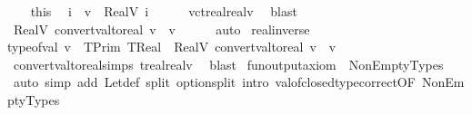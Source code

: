 \begin{isabellebody}
\ \ \isamarkupfalse%
\ this\ \isamarkupfalse%
\ i\ \ {\isachardoublequoteopen}v\ {\isacharequal}{\kern0pt}\ RealV\ i{\isachardoublequoteclose}\isanewline
\ \ \ \ \isamarkupfalse%
\ vc{\isacharunderscore}{\kern0pt}treal{\isacharunderscore}{\kern0pt}realv\ \isamarkupfalse%
\ blast\isanewline
\ \ \isamarkupfalse%
\ {\isachardoublequoteopen}RealV\ {\isacharparenleft}{\kern0pt}convert{\isacharunderscore}{\kern0pt}val{\isacharunderscore}{\kern0pt}to{\isacharunderscore}{\kern0pt}real\ v{\isacharparenright}{\kern0pt}\ {\isacharequal}{\kern0pt}\ v{\isachardoublequoteclose}\isanewline
\ \ \ \ \isamarkupfalse%
\ auto\isanewline
{}\isamarkupfalse%
%
\endisatagproof
{\isafoldproof}%
%
\isadelimproof
\isanewline
%
\endisadelimproof
\isanewline
{}\isamarkupfalse%
\ real{\isacharunderscore}{\kern0pt}inverse{\isacharunderscore}{\kern0pt}{}{\isacharcolon}{\kern0pt}\isanewline
{\isachardoublequoteopen}type{\isacharunderscore}{\kern0pt}of{\isacharunderscore}{\kern0pt}val\ v\ {\isacharequal}{\kern0pt}\ TPrim\ TReal\ {\isasymLongrightarrow}\ RealV\ {\isacharparenleft}{\kern0pt}convert{\isacharunderscore}{\kern0pt}val{\isacharunderscore}{\kern0pt}to{\isacharunderscore}{\kern0pt}real\ v{\isacharparenright}{\kern0pt}\ {\isacharequal}{\kern0pt}\ v{\isachardoublequoteclose}\isanewline
%
\isadelimproof
\ \ %
\endisadelimproof
%
\isatagproof
{}\isamarkupfalse%
\ convert{\isacharunderscore}{\kern0pt}val{\isacharunderscore}{\kern0pt}to{\isacharunderscore}{\kern0pt}real{\isachardot}{\kern0pt}simps{\isacharparenleft}{\kern0pt}{}{\isacharparenright}{\kern0pt}\ treal{\isacharunderscore}{\kern0pt}realv\ \isamarkupfalse%
\ blast%
\endisatagproof
{\isafoldproof}%
%
\isadelimproof
%
\endisadelimproof
%
\isadelimdocument
%
\endisadelimdocument
%
\isatagdocument
%
\isamarkuptrue%
%
\endisatagdocument
{\isafolddocument}%
%
\isadelimdocument
%
\endisadelimdocument
{}\isamarkupfalse%
\ fun{\isacharunderscore}{\kern0pt}output{\isacharunderscore}{\kern0pt}axiom\ \ NonEmptyTypes\ {\isacharequal}{\kern0pt}\isanewline
{\isacharparenleft}{\kern0pt}\ {\isacharparenleft}{\kern0pt}auto\ simp\ add{\isacharcolon}{\kern0pt}\ Let{\isacharunderscore}{\kern0pt}def\ split{\isacharcolon}{\kern0pt}\ option{\isachardot}{\kern0pt}split\ intro{\isacharcolon}{\kern0pt}\ val{\isacharunderscore}{\kern0pt}of{\isacharunderscore}{\kern0pt}closed{\isacharunderscore}{\kern0pt}type{\isacharunderscore}{\kern0pt}correct{\isacharbrackleft}{\kern0pt}OF\ NonEmptyTypes{\isacharbrackright}{\kern0pt}{\isacharparenright}{\kern0pt}\ {\isacharparenright}{\kern0pt}\isanewline

\end{isabellebody}
